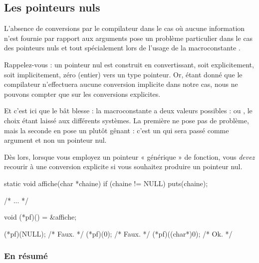 \subsection{Les pointeurs nuls}
\label{les-pointeurs-nuls}

L'absence de conversions par le compilateur dans le cas où aucune
information n'est fournie par rapport aux arguments pose un problème
particulier dans le cas des pointeurs nuls et tout spécialement lors de
l'usage de la macroconstante .

Rappelez-vous : un pointeur nul est construit en convertissant, soit
explicitement, soit implicitement, zéro (entier) vers un type pointeur.
Or, étant donné que le compilateur n'effectuera aucune conversion
implicite dans notre cas, nous ne pouvons compter que sur les
conversions explicites.

Et c'est ici que le bât blesse : la macroconstante  a deux
valeurs possibles :  ou , le choix étant
laissé aux différents systèmes. La première ne pose pas de problème,
mais la seconde en pose un plutôt gênant : c'est un  qui
sera passé comme argument et non un pointeur nul.

Dès lors, lorsque vous employez un pointeur « générique » de fonction,
vous \emph{devez} recourir à une conversion explicite si vous souhaitez
produire un pointeur nul.

\begin{C}
static void affiche(char *chaine)
{
    if (chaine != NULL)
        puts(chaine);
}

/* ... */

void (*pf)() = &affiche;

(*pf)(NULL); /* Faux. */
(*pf)(0); /* Faux. */
(*pf)((char*)0); /* Ok. */
\end{C}

\hrulefill

\subsubsection*{\small{En résumé}}
\label{en-resume-6}

